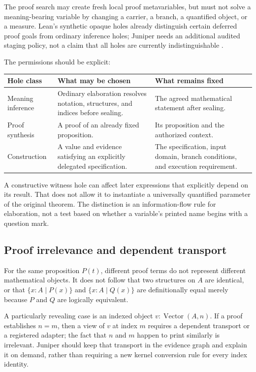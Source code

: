 \documentclass[11pt,a4paper]{article}
\theoremstyle{definition}\newtheorem{definition}[theorem]{Definition}
\theoremstyle{remark}\newtheorem{remark}[theorem]{Remark}
\begin{document}
The proof search may create fresh local proof metavariables, but must not solve a meaning-bearing variable by changing a carrier, a branch, a quantified object, or a measure. Lean's synthetic opaque holes already distinguish certain deferred proof goals from ordinary inference holes; Juniper needs an additional audited staging policy, not a claim that all holes are currently indistinguishable \cite{leanHoles}.

The permissions should be explicit:
\begin{center}\small
\begin{tabularx}{\textwidth}{@{}L{29mm}Y Y@{}}\toprule
Hole class & What may be chosen & What remains fixed\\\midrule
Meaning inference & Ordinary elaboration resolves notation, structures, and indices before sealing. & The agreed mathematical statement after sealing.\\
Proof synthesis & A proof of an already fixed proposition. & Its proposition and the authorized context.\\
Construction & A value and evidence satisfying an explicitly delegated specification. & The specification, input domain, branch conditions, and execution requirement.\\\bottomrule
\end{tabularx}
\end{center}

A constructive witness hole can affect later expressions that explicitly depend on its result. That does not allow it to instantiate a universally quantified parameter of the original theorem. The distinction is an information-flow rule for elaboration, not a test based on whether a variable's printed name begins with a question mark.

\subsection{Proof irrelevance and dependent transport}
For the same proposition $P(t)$, different proof terms do not represent different mathematical objects. It does not follow that two structures on $A$ are identical, or that $\{x:A\mid P(x)\}$ and $\{x:A\mid Q(x)\}$ are definitionally equal merely because $P$ and $Q$ are logically equivalent.

A particularly revealing case is an indexed object $v:\operatorname{Vector}(A,n)$. If a proof establishes $n=m$, then a view of $v$ at index $m$ requires a dependent transport or a registered adapter; the fact that $n$ and $m$ happen to print similarly is irrelevant. Juniper should keep that transport in the evidence graph and explain it on demand, rather than requiring a new kernel conversion rule for every index identity.
\end{document}
